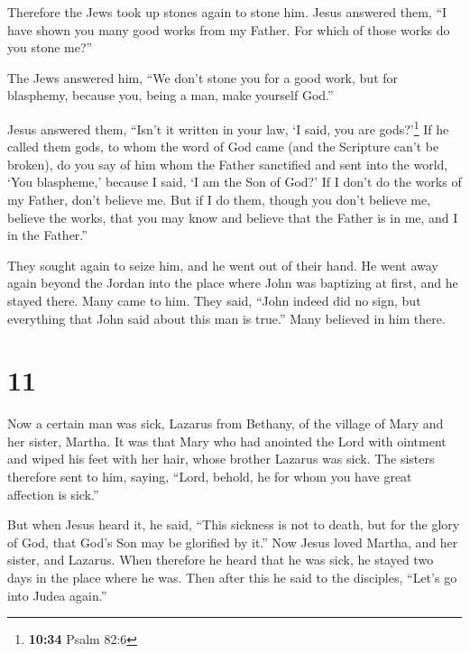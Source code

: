  Therefore the Jews took up stones again to stone him.
 Jesus answered them, ``I have shown you many good works
from my Father. For which of those works do you stone me?''

 The Jews answered him, ``We don't stone you for a good
work, but for blasphemy, because you, being a man, make yourself God.''

 Jesus answered them, ``Isn't it written in your law, `I
said, you are gods?'\footnote{\textbf{10:34} Psalm 82:6} 
If he called them gods, to whom the word of God came (and the Scripture
can't be broken),  do you say of him whom the Father
sanctified and sent into the world, `You blaspheme,' because I said, `I
am the Son of God?'  If I don't do the works of my
Father, don't believe me.  But if I do them, though you
don't believe me, believe the works, that you may know and believe that
the Father is in me, and I in the Father.''

 They sought again to seize him, and he went out of their
hand.  He went away again beyond the Jordan into the
place where John was baptizing at first, and he stayed there.
 Many came to him. They said, ``John indeed did no sign,
but everything that John said about this man is true.'' 
Many believed in him there.

\hypertarget{section-10}{%
\section{11}\label{section-10}}

 Now a certain man was sick, Lazarus from Bethany, of the
village of Mary and her sister, Martha.  It was that Mary
who had anointed the Lord with ointment and wiped his feet with her
hair, whose brother Lazarus was sick.  The sisters
therefore sent to him, saying, ``Lord, behold, he for whom you have
great affection is sick.''

 But when Jesus heard it, he said, ``This sickness is not
to death, but for the glory of God, that God's Son may be glorified by
it.''  Now Jesus loved Martha, and her sister, and
Lazarus.  When therefore he heard that he was sick, he
stayed two days in the place where he was.  Then after
this he said to the disciples, ``Let's go into Judea again.''

